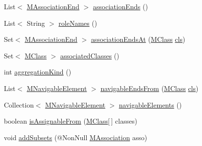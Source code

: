 \begin{DoxyCompactItemize}
\item 
List$<$ \hyperlink{classorg_1_1tzi_1_1use_1_1uml_1_1mm_1_1_m_association_end}{M\-Association\-End} $>$ \hyperlink{classorg_1_1tzi_1_1use_1_1uml_1_1mm_1_1_m_association_class_impl_a5b684f0b90adc7a971c9f5d2d0c99288}{association\-Ends} ()
\item 
List$<$ String $>$ \hyperlink{classorg_1_1tzi_1_1use_1_1uml_1_1mm_1_1_m_association_class_impl_aadfa1ff3d5162c57932c52b792d48c1e}{role\-Names} ()
\item 
Set$<$ \hyperlink{classorg_1_1tzi_1_1use_1_1uml_1_1mm_1_1_m_association_end}{M\-Association\-End} $>$ \hyperlink{classorg_1_1tzi_1_1use_1_1uml_1_1mm_1_1_m_association_class_impl_a50ff94521834e9ab7295dc58024e9c90}{association\-Ends\-At} (\hyperlink{interfaceorg_1_1tzi_1_1use_1_1uml_1_1mm_1_1_m_class}{M\-Class} \hyperlink{classorg_1_1tzi_1_1use_1_1uml_1_1mm_1_1_m_association_class_impl_aa759163a8fdc1a248abd8183235839e0}{cls})
\item 
Set$<$ \hyperlink{interfaceorg_1_1tzi_1_1use_1_1uml_1_1mm_1_1_m_class}{M\-Class} $>$ \hyperlink{classorg_1_1tzi_1_1use_1_1uml_1_1mm_1_1_m_association_class_impl_a7731e0a64feb873daa05a8bf2c21c4b7}{associated\-Classes} ()
\item 
int \hyperlink{classorg_1_1tzi_1_1use_1_1uml_1_1mm_1_1_m_association_class_impl_a097df410fdd8ae061c27960a2cf996b8}{aggregation\-Kind} ()
\item 
List$<$ \hyperlink{interfaceorg_1_1tzi_1_1use_1_1uml_1_1mm_1_1_m_navigable_element}{M\-Navigable\-Element} $>$ \hyperlink{classorg_1_1tzi_1_1use_1_1uml_1_1mm_1_1_m_association_class_impl_ac0f1ecf9e977b44266302705f3ccb033}{navigable\-Ends\-From} (\hyperlink{interfaceorg_1_1tzi_1_1use_1_1uml_1_1mm_1_1_m_class}{M\-Class} \hyperlink{classorg_1_1tzi_1_1use_1_1uml_1_1mm_1_1_m_association_class_impl_aa759163a8fdc1a248abd8183235839e0}{cls})
\item 
Collection$<$ \hyperlink{interfaceorg_1_1tzi_1_1use_1_1uml_1_1mm_1_1_m_navigable_element}{M\-Navigable\-Element} $>$ \hyperlink{classorg_1_1tzi_1_1use_1_1uml_1_1mm_1_1_m_association_class_impl_a6e8852802341ab6fe589fb0a550a9b96}{navigable\-Elements} ()
\item 
boolean \hyperlink{classorg_1_1tzi_1_1use_1_1uml_1_1mm_1_1_m_association_class_impl_a937009fc17b72f9fe4e0e8b83df8bdfd}{is\-Assignable\-From} (\hyperlink{interfaceorg_1_1tzi_1_1use_1_1uml_1_1mm_1_1_m_class}{M\-Class}\mbox{[}$\,$\mbox{]} classes)
\item 
void \hyperlink{classorg_1_1tzi_1_1use_1_1uml_1_1mm_1_1_m_association_class_impl_a9af1d659a53ff8f954ec9a54123f1df8}{add\-Subsets} (@Non\-Null \hyperlink{interfaceorg_1_1tzi_1_1use_1_1uml_1_1mm_1_1_m_association}{M\-Association} asso)

\end{DoxyCompactItemize}
